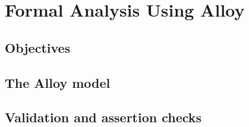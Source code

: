 \section{Formal Analysis Using Alloy}


\subsection{Objectives}

\subsection{The Alloy model}

\subsection{Validation and assertion checks}

